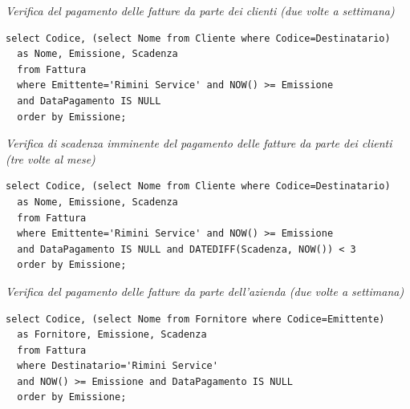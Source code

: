 \noindent\textit{Verifica del pagamento delle fatture da parte dei clienti (due volte a settimana)}
\begin{verbatim}
select Codice, (select Nome from Cliente where Codice=Destinatario)
  as Nome, Emissione, Scadenza
  from Fattura
  where Emittente='Rimini Service' and NOW() >= Emissione
  and DataPagamento IS NULL
  order by Emissione;
\end{verbatim}
\vspace{0.5cm}

\noindent{}
\newline\newline

\noindent\textit{Verifica di scadenza imminente del pagamento delle fatture da parte dei clienti (tre volte al mese)}
\begin{verbatim}
select Codice, (select Nome from Cliente where Codice=Destinatario)
  as Nome, Emissione, Scadenza
  from Fattura
  where Emittente='Rimini Service' and NOW() >= Emissione
  and DataPagamento IS NULL and DATEDIFF(Scadenza, NOW()) < 3
  order by Emissione;
\end{verbatim}
\vspace{0.5cm}

\noindent{}
\newline\newline

\noindent\textit{Verifica del pagamento delle fatture da parte dell'azienda (due volte a settimana)}
\begin{verbatim}
select Codice, (select Nome from Fornitore where Codice=Emittente)
  as Fornitore, Emissione, Scadenza
  from Fattura
  where Destinatario='Rimini Service'
  and NOW() >= Emissione and DataPagamento IS NULL
  order by Emissione;
\end{verbatim}
\vspace{0.5cm}

